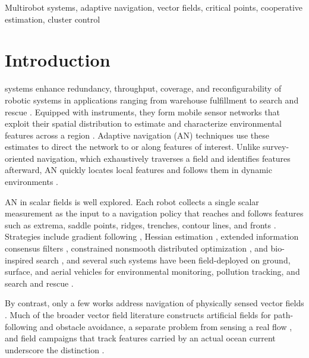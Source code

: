 \documentclass[lettersize,journal]{IEEEtran}
\begin{document}
\begin{IEEEkeywords}
Multirobot systems, adaptive navigation, vector fields, critical points, cooperative estimation, cluster control
\end{IEEEkeywords}


\section{Introduction}

 systems enhance redundancy, throughput, coverage, and reconfigurability of robotic systems in applications ranging from warehouse fulfillment to search and rescue \cite{1}. Equipped with instruments, they form mobile sensor networks that exploit their spatial distribution to estimate and characterize environmental features across a region \cite{2,3,4}. Adaptive navigation (AN) techniques use these estimates to direct the network to or along features of interest. Unlike survey-oriented navigation, which exhaustively traverses a field and identifies features afterward, AN quickly locates local features and follows them in dynamic environments \cite{5,6,7}.

AN in scalar fields is well explored. Each robot collects a single scalar measurement as the input to a navigation policy that reaches and follows features such as extrema, saddle points, ridges, trenches, contour lines, and fronts \cite{5,6,7,8,9}. Strategies include gradient following \cite{10}, Hessian estimation \cite{4}, extended information consensus filters \cite{11,13}, constrained nonsmooth distributed optimization \cite{14}, and bio-inspired search \cite{15}, and several such systems have been field-deployed on ground, surface, and aerial vehicles for environmental monitoring, pollution tracking, and search and rescue \cite{10,18,19,20}.

By contrast, only a few works address navigation of physically sensed vector fields \cite{21,22,23}. Much of the broader vector field literature constructs artificial fields for path-following and obstacle avoidance, a separate problem from sensing a real flow \cite{24,25,26,28}, and field campaigns that track features carried by an actual ocean current underscore the distinction \cite{29}.
\end{document}
